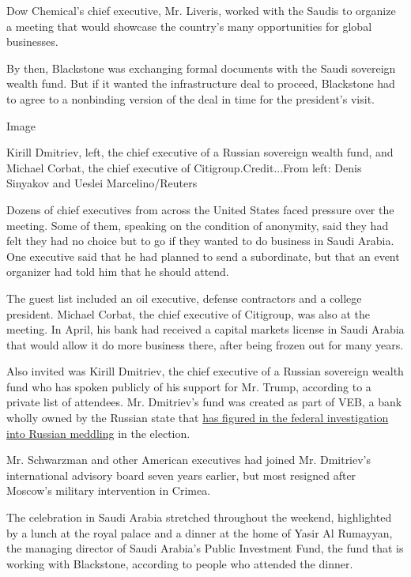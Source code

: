 Dow Chemical's chief executive, Mr. Liveris, worked with the Saudis to
organize a meeting that would showcase the country's many opportunities
for global businesses.

By then, Blackstone was exchanging formal documents with the Saudi
sovereign wealth fund. But if it wanted the infrastructure deal to
proceed, Blackstone had to agree to a nonbinding version of the deal in
time for the president's visit.

Image

Kirill Dmitriev, left, the chief executive of a Russian sovereign wealth
fund, and Michael Corbat, the chief executive of Citigroup.Credit...From
left: Denis Sinyakov and Ueslei Marcelino/Reuters

Dozens of chief executives from across the United States faced pressure
over the meeting. Some of them, speaking on the condition of anonymity,
said they had felt they had no choice but to go if they wanted to do
business in Saudi Arabia. One executive said that he had planned to send
a subordinate, but that an event organizer had told him that he should
attend.

The guest list included an oil executive, defense contractors and a
college president. Michael Corbat, the chief executive of Citigroup, was
also at the meeting. In April, his bank had received a capital markets
license in Saudi Arabia that would allow it do more business there,
after being frozen out for many years.

Also invited was Kirill Dmitriev, the chief executive of a Russian
sovereign wealth fund who has spoken publicly of his support for Mr.
Trump, according to a private list of attendees. Mr. Dmitriev's fund was
created as part of VEB, a bank wholly owned by the Russian state that
\href{https://www.nytimes3xbfgragh.onion/2017/06/04/business/vnesheconombank-veb-bank-russia-trump-kushner.html}{has
figured in the federal investigation into Russian meddling} in the
election.

Mr. Schwarzman and other American executives had joined Mr. Dmitriev's
international advisory board seven years earlier, but most resigned
after Moscow's military intervention in Crimea.

The celebration in Saudi Arabia stretched throughout the weekend,
highlighted by a lunch at the royal palace and a dinner at the home of
Yasir Al Rumayyan, the managing director of Saudi Arabia's Public
Investment Fund, the fund that is working with Blackstone, according to
people who attended the dinner.

